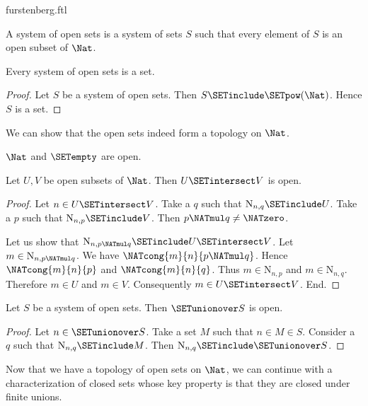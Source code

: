 \documentclass{stex}
\newcommand{\N}{\mathrm{N}}
\begin{document}
\begin{smodule}{furstenberg.ftl}
\begin{forthel}
  \begin{definition}
    A system of open sets is a system of sets $S$ such that every element of
    $S$ is an open subset of $\Nat$.
  \end{definition}

  \begin{lemma}
    Every system of open sets is a set.
  \end{lemma}
  \begin{proof}
    Let $S$ be a system of open sets.
    Then $S \SETinclude \SETpow(\Nat)$.
    Hence $S$ is a set.
  \end{proof}
\end{forthel}

We can show that the open sets indeed form a topology on $\Nat$.

\begin{forthel}
  \begin{lemma}
    $\Nat$ and $\SETempty$ are open.
  \end{lemma}

  \begin{lemma}
    Let $U,V$ be open subsets of $\Nat$.
    Then $U \SETintersect V$ is open.
  \end{lemma}
  \begin{proof}
    Let $n \in U \SETintersect V$.
    Take a $q$ such that $\N_{n, q} \SETinclude U$.
    Take a $p$ such that $\N_{n, p} \SETinclude V$.
    Then $p \NATmul q \neq \NATzero$.

    Let us show that $\N_{n, p \NATmul q} \SETinclude U \SETintersect V$.
      Let $m \in \N_{n, p \NATmul q}$.
      We have $\NATcong{m}{n}{p \NATmul q}$.
      Hence $\NATcong{m}{n}{p}$ and $\NATcong{m}{n}{q}$.
      Thus $m \in \N_{n, p}$ and $m \in \N_{n, q}$.
      Therefore $m \in U$ and $m \in V$.
      Consequently $m \in U \SETintersect V$.
    End.
  \end{proof}

  \begin{lemma}
    Let $S$ be a system of open sets.
    Then $\SETunionover S$ is open.
  \end{lemma}
  \begin{proof}
    Let $n \in \SETunionover S$.
    Take a set $M$ such that $n \in M \in S$.
    Consider a $q$ such that $\N_{n, q} \SETinclude M$.
    Then $\N_{n, q} \SETinclude \SETunionover S$.
  \end{proof}
\end{forthel}

Now that we have a topology of open sets on $\Nat$, we can continue
with a characterization of closed sets whose key property is that they are
closed under finite unions.


\end{smodule}
\end{document}
